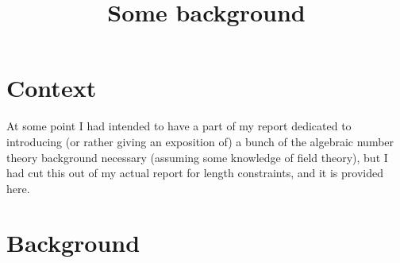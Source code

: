 \documentclass[11pt]{article}
\title{Some background}
\begin{document}
\maketitle
\section{Context}
At some point I had intended to have a part of my report dedicated to introducing (or rather giving an exposition of) a bunch of the algebraic number theory background necessary (assuming some knowledge of field theory), but I had cut this out of my actual report for length constraints, and it is provided here.
\section{Background}
\end{document}

